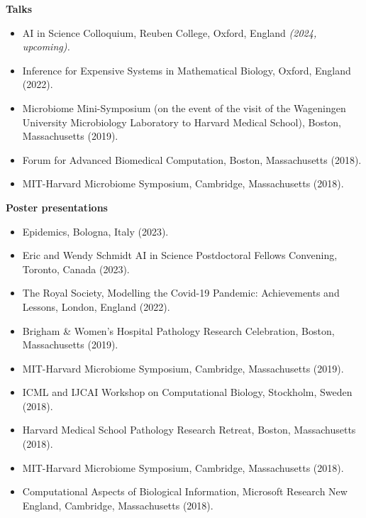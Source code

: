 \documentclass[10pt]{article}
\begin{document}
\noindent\textbf{Talks}
\vspace*{.5cm}
\begin{itemize}[leftmargin=*]
\setlength{\itemsep}{4pt}
\setlength{\parskip}{0pt}
\setlength{\parsep}{0pt}
\vspace{-.5cm}
\item AI in Science Colloquium, Reuben College, Oxford, England \emph{(2024, upcoming).}
\item Inference for Expensive Systems in Mathematical Biology, Oxford, England (2022).
\item Microbiome Mini-Symposium (on the event of the visit of the Wageningen University Microbiology Laboratory to Harvard Medical School), Boston, Massachusetts (2019).
\item Forum for Advanced Biomedical Computation, Boston, Massachusetts (2018).
\item MIT-Harvard Microbiome Symposium, Cambridge, Massachusetts (2018).
\end{itemize}


\vspace*{.4cm}
\noindent\textbf{Poster presentations}
\vspace*{.5cm}
\begin{itemize}[leftmargin=*]
\setlength{\itemsep}{4pt}
\setlength{\parskip}{0pt}
\setlength{\parsep}{0pt}
\vspace{-.5cm}
\item Epidemics, Bologna, Italy (2023).
\item Eric and Wendy Schmidt AI in Science Postdoctoral Fellows Convening, Toronto, Canada (2023).
\item The Royal Society, Modelling the Covid-19 Pandemic: Achievements and Lessons, London, England (2022).
\item Brigham \& Women's Hospital Pathology Research Celebration, Boston, Massachusetts (2019).
\item MIT-Harvard Microbiome Symposium, Cambridge, Massachusetts (2019).
\item ICML and IJCAI Workshop on Computational Biology, Stockholm, Sweden (2018).
\item Harvard Medical School Pathology Research Retreat, Boston, Massachusetts (2018).
\item MIT-Harvard Microbiome Symposium, Cambridge, Massachusetts (2018).
\item Computational Aspects of Biological Information, Microsoft Research New England, Cambridge, Massachusetts (2018).
\end{itemize}
\end{document}
